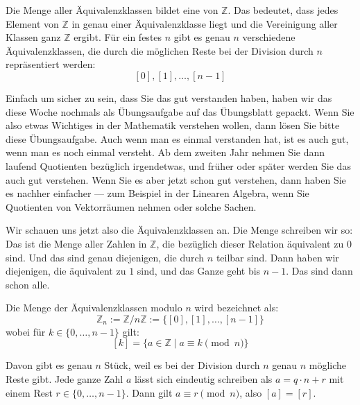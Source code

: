 \begin{math-stroke}

\begin{explanation-of-steps}
Die Menge aller Äquivalenzklassen bildet eine  von $\mathbb{Z}$. Das bedeutet, dass jedes Element von $\mathbb{Z}$ in genau einer Äquivalenzklasse liegt und die Vereinigung aller Klassen ganz $\mathbb{Z}$ ergibt. Für ein festes $n$ gibt es genau $n$ verschiedene Äquivalenzklassen, die durch die möglichen Reste bei der Division durch $n$ repräsentiert werden:
\[
[0], [1], \dots, [n-1]
\]
\end{explanation-of-steps}
\end{math-stroke}

\begin{spoken-clean}[00:03:14 - 00:05:33]
Einfach um sicher zu sein, dass Sie das gut verstanden haben, haben wir das diese Woche nochmals als Übungsaufgabe auf das Übungsblatt gepackt. Wenn Sie also etwas Wichtiges in der Mathematik verstehen wollen, dann lösen Sie bitte diese Übungsaufgabe. Auch wenn man es einmal verstanden hat, ist es auch gut, wenn man es noch einmal versteht. Ab dem zweiten Jahr nehmen Sie dann laufend Quotienten bezüglich irgendetwas, und früher oder später werden Sie das auch gut verstehen. Wenn Sie es aber jetzt schon gut verstehen, dann haben Sie es nachher einfacher --- zum Beispiel in der Linearen Algebra, wenn Sie Quotienten von Vektorräumen nehmen oder solche Sachen.

Wir schauen uns jetzt also die Äquivalenzklassen an. Die Menge schreiben wir so: Das ist die Menge aller Zahlen in $\mathbb{Z}$, die bezüglich dieser Relation äquivalent zu $0$ sind. Und das sind genau diejenigen, die durch $n$ teilbar sind. Dann haben wir diejenigen, die äquivalent zu $1$ sind, und das Ganze geht bis $n - 1$. Das sind dann schon alle.
\end{spoken-clean}

\begin{math-stroke}
Die Menge der Äquivalenzklassen modulo $n$ wird bezeichnet als:
\[
\mathbb{Z}_n := \mathbb{Z} / n\mathbb{Z} := \{ [0], [1], \dots, [n-1] \}
\]
wobei für $k \in \{0, \dots, n-1\}$ gilt:
\[
[k] = \{ a \in \mathbb{Z} \mid a \equiv k \pmod n \}
\]

\begin{explanation-of-steps}
Davon gibt es genau $n$ Stück, weil es bei der Division durch $n$ genau $n$ mögliche Reste gibt. Jede ganze Zahl $a$ lässt sich eindeutig schreiben als $a = q \cdot n + r$ mit einem Rest $r \in \{0, \dots, n-1\}$. Dann gilt $a \equiv r \pmod n$, also $[a] = [r]$.
\end{explanation-of-steps}
\end{math-stroke}

